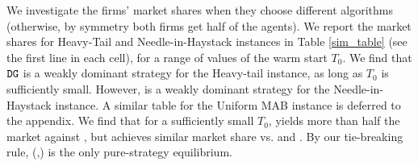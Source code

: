 \documentclass[../competing_bandits.tex]{subfiles}
\begin{document}




We investigate the firms' market shares when they choose different algorithms (otherwise, by symmetry both firms get half of the agents). We report the market shares for Heavy-Tail and Needle-in-Haystack instances in Table \ref{sim_table}  (see the first line in each cell), for a range of values of the warm start $T_0$. We find that $\mathtt{DG}$ is a weakly dominant strategy for the Heavy-tail instance, as long as $T_0$ is sufficiently small. However, \TS is a weakly dominant strategy for the Needle-in-Haystack instance. A similar table for the Uniform MAB instance is deferred to the appendix. We find that for a sufficiently small $T_0$, \DG yields more than half the market against \TS,  but achieves similar market share vs. \DG and \DEG. By our tie-breaking rule, (\DG,\DG) is the only pure-strategy equilibrium.
\end{document}
